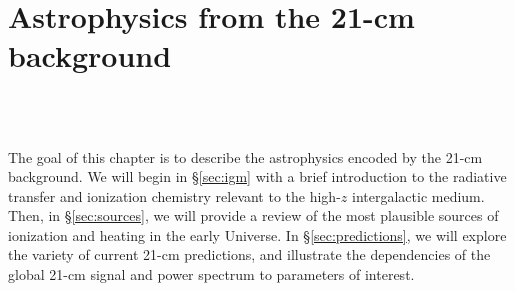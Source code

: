 

\chapter{Astrophysics from the 21-cm background}

\begin{bf}
  \author{Jordan Mirocha}\\
\\
\end{bf}

The goal of this chapter is to describe the astrophysics encoded by the 21-cm background. We will begin in \S\ref{sec:igm} with a brief introduction to the radiative transfer and ionization chemistry relevant to the high-$z$ intergalactic medium. Then, in \S\ref{sec:sources}, we will provide a review of the most plausible sources of ionization and heating in the early Universe. In \S\ref{sec:predictions}, we will explore the variety of current 21-cm predictions, and illustrate the dependencies of the global 21-cm signal and power spectrum to parameters of interest.

%
%


